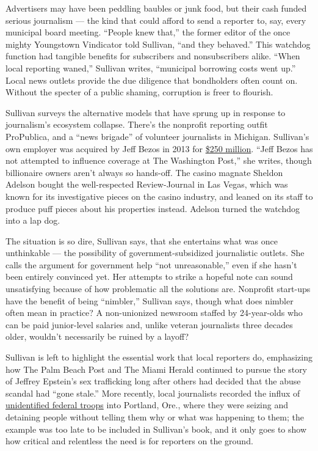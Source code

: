 Advertisers may have been peddling baubles or junk food, but their cash
funded serious journalism --- the kind that could afford to send a
reporter to, say, every municipal board meeting. ``People knew that,''
the former editor of the once mighty Youngstown Vindicator told
Sullivan, ``and they behaved.'' This watchdog function had tangible
benefits for subscribers and nonsubscribers alike. ``When local
reporting waned,'' Sullivan writes, ``municipal borrowing costs went
up.'' Local news outlets provide the due diligence that bondholders
often count on. Without the specter of a public shaming, corruption is
freer to flourish.

Sullivan surveys the alternative models that have sprung up in response
to journalism's ecosystem collapse. There's the nonprofit reporting
outfit ProPublica, and a ``news brigade'' of volunteer journalists in
Michigan. Sullivan's own employer was acquired by Jeff Bezos in 2013 for
\href{https://www.nytimes.com/2019/02/11/business/media/washington-post-jeff-bezos.html}{\$250
million}. ``Jeff Bezos has not attempted to influence coverage at The
Washington Post,'' she writes, though billionaire owners aren't always
so hands-off. The casino magnate Sheldon Adelson bought the
well-respected Review-Journal in Las Vegas, which was known for its
investigative pieces on the casino industry, and leaned on its staff to
produce puff pieces about his properties instead. Adelson turned the
watchdog into a lap dog.

The situation is so dire, Sullivan says, that she entertains what was
once unthinkable --- the possibility of government-subsidized
journalistic outlets. She calls the argument for government help ``not
unreasonable,'' even if she hasn't been entirely convinced yet. Her
attempts to strike a hopeful note can sound unsatisfying because of how
problematic all the solutions are. Nonprofit start-ups have the benefit
of being ``nimbler,'' Sullivan says, though what does nimbler often mean
in practice? A non-unionized newsroom staffed by 24-year-olds who can be
paid junior-level salaries and, unlike veteran journalists three decades
older, wouldn't necessarily be ruined by a layoff?

Sullivan is left to highlight the essential work that local reporters
do, emphasizing how The Palm Beach Post and The Miami Herald continued
to pursue the story of Jeffrey Epstein's sex trafficking long after
others had decided that the abuse scandal had ``gone stale.'' More
recently, local journalists recorded the influx of
\href{https://www.opb.org/news/article/federal-law-enforcement-unmarked-vehicles-portland-protesters/}{unidentified
federal troops} into Portland, Ore., where they were seizing and
detaining people without telling them why or what was happening to them;
the example was too late to be included in Sullivan's book, and it only
goes to show how critical and relentless the need is for reporters on
the ground.


